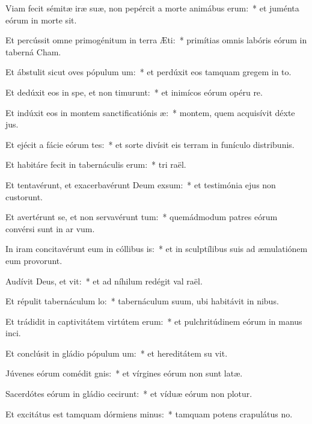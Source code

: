 \item Viam fecit sémitæ iræ suæ, non pepércit a morte animábus erum:~* et juménta eórum in morte sit.
\item Et percússit omne primogénitum in terra Æti:~* primítias omnis labóris eórum in taberná Cham.
\item Et ábstulit sicut oves pópulum um:~* et perdúxit eos tamquam gregem in to.
\item Et dedúxit eos in spe, et non timurunt:~* et inimícos eórum opéru re.
\item Et indúxit eos in montem sanctificatiónis æ:~* montem, quem acquisívit déxte jus.
\item Et ejécit a fácie eórum tes:~* et sorte divísit eis terram in funículo distribunis.
\item Et habitáre fecit in tabernáculis erum:~* tri raël.
\item Et tentavérunt, et exacerbavérunt Deum exsum:~* et testimónia ejus non custorunt.
\item Et avertérunt se, et non servavérunt tum:~* quemádmodum patres eórum convérsi sunt in ar vum.
\item In iram concitavérunt eum in cóllibus is:~* et in sculptílibus suis ad æmulatiónem eum provorunt.
\item Audívit Deus, et vit:~* et ad níhilum redégit val raël.
\item Et répulit tabernáculum lo:~* tabernáculum suum, ubi habitávit in nibus.
\item Et trádidit in captivitátem virtútem erum:~* et pulchritúdinem eórum in manus inci.
\item Et conclúsit in gládio pópulum um:~* et hereditátem su vit.
\item Júvenes eórum comédit gnis:~* et vírgines eórum non sunt latæ.
\item Sacerdótes eórum in gládio cecirunt:~* et víduæ eórum non plotur.
\item Et excitátus est tamquam dórmiens minus:~* tamquam potens crapulátus  no.
